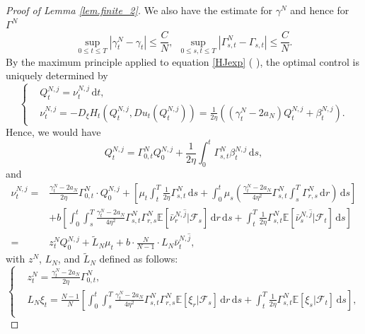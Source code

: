 \documentclass[10pt]{article}
\begin{document}
\begin{proof}[Proof of Lemma \ref{lem.finite_2}]
We also have the estimate for $\gamma^N$ and hence for $\Gamma^N$
\begin{equation}\label{estimate_for_gammaN}
    \sup_{0 \leq t \leq T} \left| \gamma_t^N - \gamma_t \right| \leq \frac{C}{N},~~ \sup_{0 \leq s,t \leq T} \left| \Gamma_{s,t}^N - \Gamma_{s,t} \right| \leq \frac{C}{N}.
\end{equation}
By the maximum principle applied to equation \eqref{HJexp} (\citeauthor{bismut1976linear} \cite{bismut1976linear}), the optimal control is uniquely determined by
\begin{equation}
    \left\{
        \begin{aligned}
            & Q_t^{N,j} = \nu_t^{N,j} \, \mathrm{d}t,\\
            & \nu_t^{N,j} = - D_\xi H_t (Q_t^{N,j}, D u_t(Q_t^{N,j})) = \frac{1}{2\eta} \left( (\gamma_t^N - 2 a_N) Q_t^{N,j} + \beta_{t}^{N,j} \right).
        \end{aligned}
    \right.
\end{equation}
Hence, we would have
\[
    Q_t^{N,j} = \Gamma^N_{0,t} Q_0^{N,j} + \frac{1}{2\eta} \int_0^t \Gamma^N_{s,t} \beta_t^{N,j} \, \mathrm{d}s,
\]
and
\begin{equation}\label{noname1}
\begin{aligned}
    \nu_t^{N,j} = & \frac{\gamma_t^N - 2 a_N}{2\eta} \Gamma^N_{0,t} \cdot Q_0^{N,j} + \left[  \mu_t \int_t^T \frac{1}{2\eta} \Gamma^N_{s,t} \, \mathrm{d}s + \int_0^t \mu_s \left( \frac{\gamma_t^N - 2 a_N}{4\eta^2} \Gamma^N_{s,t} \int_s^T \Gamma^N_{r,s} \, \mathrm{d}r \right) \, \mathrm{d}s \right] \\
    & + b \left[  \int_0^t \int_s^T  \frac{\gamma_t^N - 2 a_N}{4\eta^2} \Gamma^N_{s,t} \Gamma^N_{r,s} \mathbb{E}[\bar \nu_r^{N,\hat{j}} | \mathcal{F}_s] \, \mathrm{d}r \, \mathrm{d}s + \int_t^T \frac{1}{2\eta} \Gamma^N_{s,t} \mathbb{E}[\bar \nu_s^{N,\hat{j}} | \mathcal{F}_t] \, \mathrm{d}s \right] \\
    = & z_t^N Q_0^{N,j} + \tilde L_N \mu_t + b \cdot \frac{N}{N-1} \cdot L_N \bar \nu_t^{N,\hat{j}},
\end{aligned}    
\end{equation}
with $z^N$, $L_N$, and $\tilde L_N$ defined as follows:
\begin{equation*}
    \left\{
        \begin{aligned}
            & z_t^N = \frac{\gamma_t^N - 2 a_N}{2\eta} \Gamma^N_{0,t}, \\
            & L_N \xi_t = \frac{N-1}{N} \left[ \int_0^t \int_s^T  \frac{\gamma_t^N - 2 a_N}{4\eta^2} \Gamma^N_{s,t} \Gamma^N_{r,s} \mathbb{E}[\xi_r | \mathcal{F}_s] \, \mathrm{d}r \, \mathrm{d}s + \int_t^T \frac{1}{2\eta} \Gamma^N_{s,t} \mathbb{E}[\xi_s | \mathcal{F}_t] \, \mathrm{d}s \right], \\

\end{aligned}
\end{equation*}
\end{proof}
\end{document}
